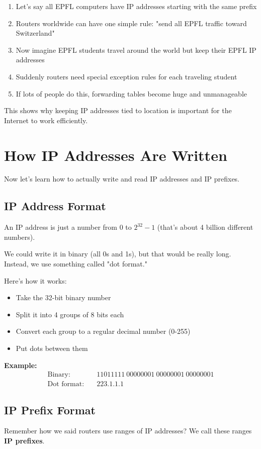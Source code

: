 \documentclass[../../compsys.tex]{subfiles}
\begin{document}
\begin{enumerate}
    \item Let's say all EPFL computers have IP addresses starting with the same prefix
    \item Routers worldwide can have one simple rule: "send all EPFL traffic toward Switzerland"
    \item Now imagine EPFL students travel around the world but keep their EPFL IP addresses
    \item Suddenly routers need special exception rules for each traveling student
    \item If lots of people do this, forwarding tables become huge and unmanageable
\end{enumerate}

This shows why keeping IP addresses tied to location is important for the Internet to work efficiently.

\section{How IP Addresses Are Written}
Now let's learn how to actually write and read IP addresses and IP prefixes.

\subsection{IP Address Format}
An IP address is just a number from 0 to $2^{32}-1$ (that's about 4 billion different numbers).

We could write it in binary (all 0s and 1s), but that would be really long. Instead, we use something called "dot format."

Here's how it works:
\begin{itemize}
    \item Take the 32-bit binary number
    \item Split it into 4 groups of 8 bits each
    \item Convert each group to a regular decimal number (0-255)
    \item Put dots between them
\end{itemize}

\textbf{Example:}
\begin{align}
\text{Binary:} &\quad 11011111\ 00000001\ 00000001\ 00000001 \\
\text{Dot format:} &\quad 223.1.1.1
\end{align}

\subsection{IP Prefix Format}
Remember how we said routers use ranges of IP addresses? We call these ranges \textbf{IP prefixes}.
\end{document}
